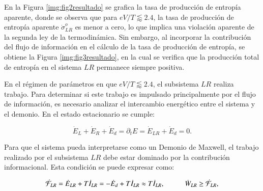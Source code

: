 

En la Figura \ref{img:fig2resultado} se grafica la tasa de producción de entropía aparente, donde se observa que para $eV/T \lessapprox 2.4$, la tasa de producción de entropía aparente $\dot{\sigma}^{o}_{LR}$ es menor a cero, lo que implica una violación aparente de la segunda ley de la termodinámica. Sin embargo, al incorporar la contribución del flujo de información en el cálculo de la tasa de producción de entropía, se obtiene la Figura \ref{img:fig3resultado}, en la cual se verifica que la producción total de entropía en el sistema $LR$ permanece siempre positiva.


En el régimen de parámetros en que \( eV/T \lessapprox 2.4 \), el subsistema \( LR \) realiza trabajo. Para determinar si este trabajo es impulsado principalmente por el flujo de información, es necesario analizar el intercambio energético entre el sistema y el demonio. En el estado estacionario se cumple:

\[
\dot{E}_{L} + \dot{E}_{R} + \dot{E}_{d} = \partial_{t}E = \dot{E}_{LR} + \dot{E}_{d} = 0.
\]

Para que el sistema pueda interpretarse como un Demonio de Maxwell, el trabajo realizado por el subsistema \( LR \) debe estar dominado por la contribución informacional. Esta condición se puede expresar como:

\[
\dot{\mathcal{F}}_{LR} = \dot{E}_{LR} + T\dot{I}_{LR} = -\dot{E}_{d} + T\dot{I}_{LR} \approx T\dot{I}_{LR}, \hspace{10mm} \dot{W}_{LR} \geq \dot{\mathcal{F}}_{LR},
\]

